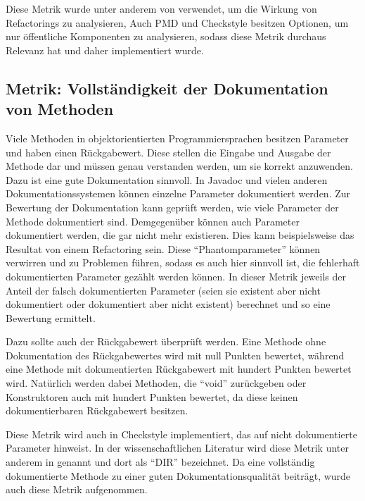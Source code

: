 Diese Metrik wurde unter anderem von \cite{Doautomaticrefactoringsimprovemaintainability?Anindustrialcasestudy} verwendet, um die Wirkung von Refactorings zu analysieren, Auch PMD und Checkstyle besitzen Optionen, um nur öffentliche Komponenten zu analysieren, sodass diese Metrik durchaus Relevanz hat und daher implementiert wurde.

 
 \subsection{Metrik: Vollständigkeit der Dokumentation von  Methoden}
 
Viele Methoden in objektorientierten Programmiersprachen besitzen Parameter und haben einen Rückgabewert. Diese stellen die Eingabe und Ausgabe der Methode dar und müssen genau verstanden werden, um sie korrekt anzuwenden. Dazu ist eine gute Dokumentation sinnvoll. In Javadoc und vielen anderen Dokumentationssystemen können einzelne Parameter dokumentiert werden. Zur Bewertung der Dokumentation kann geprüft werden, wie viele Parameter der Methode dokumentiert sind. Demgegenüber können auch Parameter dokumentiert werden, die gar nicht mehr existieren. Dies kann beispielsweise das Resultat von einem Refactoring sein. Diese \enquote{Phantomparameter} können verwirren und zu Problemen führen, sodass es auch hier sinnvoll ist, die fehlerhaft dokumentierten Parameter gezählt werden können. In dieser Metrik jeweils der Anteil der falsch dokumentierten Parameter (seien sie existent aber nicht dokumentiert oder dokumentiert aber nicht existent) berechnet und so eine Bewertung ermittelt.
 
 Dazu sollte auch der Rückgabewert überprüft werden. Eine Methode ohne Dokumentation des Rückgabewertes wird mit null Punkten bewertet, während eine Methode mit dokumentierten Rückgabewert mit hundert Punkten bewertet wird. Natürlich werden dabei Methoden, die \enquote{void} zurückgeben oder Konstruktoren auch mit hundert Punkten bewertet, da diese keinen dokumentierbaren Rückgabewert besitzen. 
 
 Diese Metrik wird auch in Checkstyle implementiert, das auf nicht dokumentierte Parameter hinweist. In der wissenschaftlichen Literatur wird diese Metrik unter anderem in \cite[S. 5]{HowDocumentationEvolvesoverTime} genannt und dort als \enquote{DIR} bezeichnet. Da eine vollständig dokumentierte Methode zu einer guten Dokumentationsqualität beiträgt, wurde auch diese Metrik aufgenommen.

